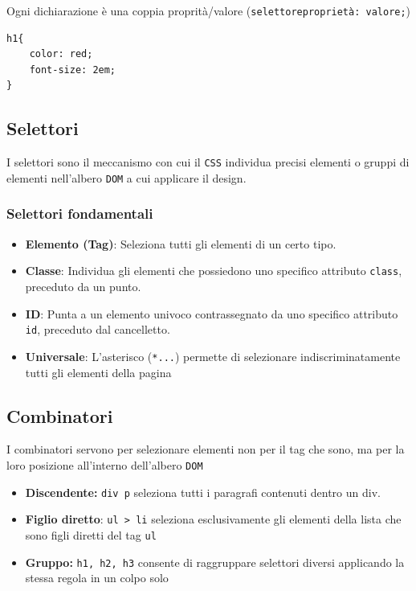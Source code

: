 Ogni dichiarazione è una coppia proprità/valore (\texttt{selettore{proprietà: valore;}})

\begin{tcolorbox}[title=Esempio codice CSS]
    \begin{lstlisting}
h1{
    color: red;
    font-size: 2em;
}
    \end{lstlisting}
\end{tcolorbox}

\subsection{Selettori}
I selettori sono il meccanismo con cui il \texttt{CSS} individua precisi elementi o gruppi di elementi nell'albero \texttt{DOM} a cui applicare il design.

\subsubsection{Selettori fondamentali}
\begin{itemize}
    \item \textbf{Elemento (Tag)}: Seleziona tutti gli elementi di un certo tipo.
    \item \textbf{Classe}: Individua gli elementi che possiedono uno specifico attributo \texttt{class}, preceduto da un punto.
    \item \textbf{ID}: Punta a un elemento univoco contrassegnato da uno specifico attributo \texttt{id}, preceduto dal cancelletto.
    \item \textbf{Universale}: L'asterisco (\texttt{*{...}}) permette di selezionare indiscriminatamente tutti gli elementi della pagina
\end{itemize}

\subsection{Combinatori}
I combinatori servono per selezionare elementi non per il tag che sono, ma per la loro posizione all'interno dell'albero \texttt{DOM}
\begin{itemize}
    \item \textbf{Discendente:} \texttt{div p} seleziona tutti i paragrafi contenuti dentro un div.
    \item \textbf{Figlio diretto}: \texttt{ul > li} seleziona esclusivamente gli elementi della lista che sono figli diretti del tag \texttt{ul}
    \item \textbf{Gruppo:} \texttt{h1, h2, h3} consente di raggruppare selettori diversi applicando la stessa regola in un colpo solo
\end{itemize}

